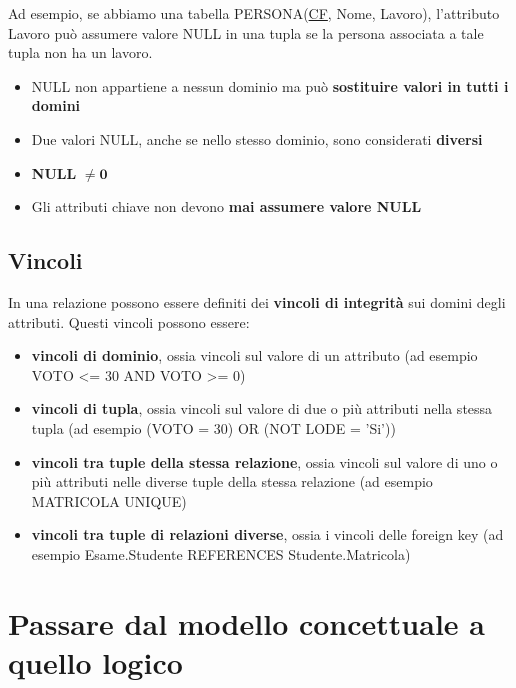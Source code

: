 \documentclass[11pt, a4paper, titlepage, oneside]{scrbook}
\begin{document}
Ad esempio, se abbiamo una tabella PERSONA(\underline{CF}, Nome, Lavoro), l'attributo Lavoro può assumere valore NULL in una tupla se la persona associata a tale tupla non ha un lavoro.

\begin{Osservazione}
\label{oss-NULL}
\begin{itemize}
    \item NULL non appartiene a nessun dominio ma può \textbf{sostituire valori in tutti i domini}
    \item Due valori NULL, anche se nello stesso dominio, sono considerati \textbf{diversi}
    \item \textbf{NULL} $\bm{\neq 0}$
    \item Gli attributi chiave non devono \textbf{mai assumere valore NULL}
\end{itemize}
\end{Osservazione}

\subsection{Vincoli}

\begin{Definizione}
\label{def-vincoli}
In una relazione possono essere definiti dei \textbf{vincoli di integrità} sui domini degli attributi. Questi vincoli possono essere:
\begin{itemize}
    \item \textbf{vincoli di dominio}, ossia vincoli sul valore di un attributo (ad esempio VOTO <= 30 AND VOTO >= 0)
    \item \textbf{vincoli di tupla}, ossia vincoli sul valore di due o più attributi nella stessa tupla (ad esempio (VOTO = 30) OR (NOT LODE = 'Si'))
    \item \textbf{vincoli tra tuple della stessa relazione}, ossia vincoli sul valore di uno o più attributi nelle diverse tuple della stessa relazione (ad esempio MATRICOLA UNIQUE)
    \item \textbf{vincoli tra tuple di relazioni diverse}, ossia i vincoli delle foreign key (ad esempio Esame.Studente REFERENCES Studente.Matricola)
\end{itemize} 
\end{Definizione}

\section{Passare dal modello concettuale a quello logico}
\end{document}
